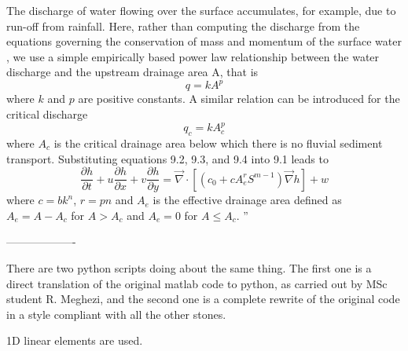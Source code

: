 The discharge of water flowing over the surface accumulates, for example, due to run-off from rainfall. Here,
rather than computing the discharge from the equations governing the conservation of mass and
momentum of the surface water \textcite{sica06}, we use a simple empirically 
based power law relationship between the water discharge and the upstream drainage area A,
that is
\[
q=kA^p
\]
where $k$ and $p$ are positive constants. A similar relation can be introduced for the critical discharge
\[
q_c=kA_c^p
\]
where $A_c$ is the critical drainage area below which there is no fluvial sediment transport. Substituting
equations 9.2, 9.3, and 9.4 into 9.1 leads to
\[
\frac{\partial h}{\partial t} + u \frac{\partial h}{\partial x}+ v \frac{\partial h}{\partial y}
= \vec\nabla \cdot \left[
(c_0 + c A_e^r S^{m-1}) \vec\nabla h
\right] + w
\]
where $c=bk^n$, $r=pn$ and $A_e$ is the effective drainage area defined as $A_e = A-A_c$ 
for $A>A_c$ and $A_e = 0$ for $A \le A_c$.
''

-------------------

There are two python scripts doing about the same thing. The first one is a direct translation 
of the original matlab code to python, as carried out by MSc student R. Meghezi, and the second
one is a complete rewrite of the original code in a style compliant with all the other stones.

1D linear elements are used.


